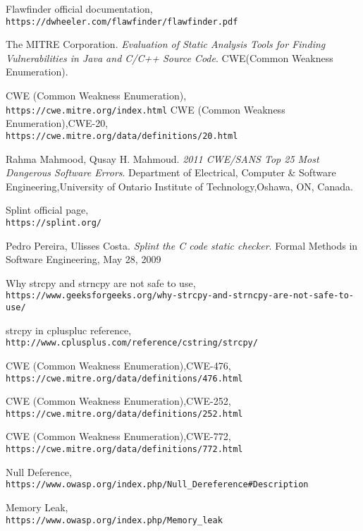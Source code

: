 \documentclass[a4paper,12pt]{article}
\begin{document}



\begin{thebibliography}{}

   Flawfinder official documentation,\\\texttt{https://dwheeler.com/flawfinder/flawfinder.pdf}

The MITRE Corporation.
\textit{Evaluation of Static Analysis Tools for Finding Vulnerabilities in Java and C/C++
Source Code}.
CWE(Common
Weakness Enumeration)\cite{CWE}.

  CWE (Common
Weakness Enumeration),\\\texttt{https://cwe.mitre.org/index.html}
  CWE (Common
Weakness Enumeration),CWE-20,\\\texttt{https://cwe.mitre.org/data/definitions/20.html}
  
Rahma Mahmood, Qusay H. Mahmoud.
\textit{2011 CWE/SANS Top 25 Most Dangerous Software Errors}.
Department of Electrical, Computer \& Software Engineering,University of Ontario Institute of Technology,Oshawa, ON, Canada.

 Splint official page,\\\texttt{https://splint.org/}    

Pedro Pereira, Ulisses Costa.
\textit{Splint the C code static checker}.
Formal Methods in Software Engineering, May 28, 2009

Why strcpy and strncpy are not safe to use,\\\texttt{https://www.geeksforgeeks.org/why-strcpy-and-strncpy-are-not-safe-to-use/}


strcpy in cpluspluc reference,\\\texttt{http://www.cplusplus.com/reference/cstring/strcpy/}
 
  CWE (Common
Weakness Enumeration),CWE-476,\\\texttt{https://cwe.mitre.org/data/definitions/476.html}

  CWE (Common
Weakness Enumeration),CWE-252,\\\texttt{https://cwe.mitre.org/data/definitions/252.html}

  CWE (Common
Weakness Enumeration),CWE-772,\\\texttt{https://cwe.mitre.org/data/definitions/772.html}

  Null Deference,\\\texttt{https://www.owasp.org/index.php/Null\_Dereference\#Description}

  Memory Leak,\\\texttt{https://www.owasp.org/index.php/Memory\_leak}

\end{thebibliography}
\end{document}
